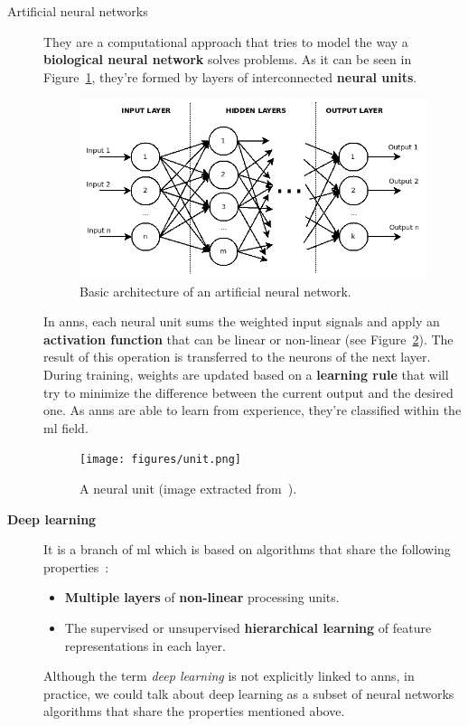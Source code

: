 \begin{description}
	\item[Artificial neural networks] They are a computational approach that tries to model the way a \textbf{biological neural network} solves problems. As it can be seen in Figure~\ref{fig:ANN}, they're formed by layers of interconnected \textbf{neural units}.
	\begin{figure}
		\centering
		\includegraphics[width=0.8\linewidth, keepaspectratio]{figures/ANN.png}
		\caption{Basic architecture of an artificial neural network.}
		\label{fig:ANN}
	\end{figure}
	
	In \glspl{ann}, each neural unit sums the weighted input signals and apply an \textbf{activation function} that can be linear or non-linear (see Figure~\ref{fig:unit}). The result of this operation is transferred to the neurons of the next layer. During training, weights are updated based on a \textbf{learning rule} that will try to minimize the difference between the current output and the desired one. As \glspl{ann} are able to learn from experience, they're classified within the \gls{ml} field.
	\begin{figure}
		\centering
		\texttt{[image: figures/unit.png]}
		\caption[A neural unit.]{A neural unit (image extracted from~\cite{neural-unit}).}
		\label{fig:unit}
	\end{figure}
\end{description}
\begin{description}
	\item[\textbf{Deep learning}] It is a branch of \gls{ml} which is based on algorithms that share the following properties~\cite{deep-learning-methods-and-applications}:
	\begin{itemize}
		\item \textbf{Multiple layers} of \textbf{non-linear} processing units.
		\item The supervised or unsupervised \textbf{hierarchical learning} of feature representations in each layer.
	\end{itemize}
	
	Although the term \textit{deep learning} is not explicitly linked to \glspl{ann}, in practice, we could talk about deep learning as a subset of neural networks algorithms that share the properties mentioned above. 
\end{description}
